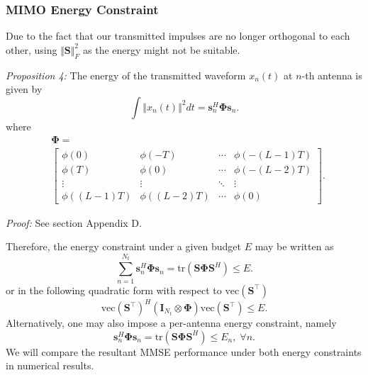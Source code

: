 \documentclass[lettersize,journal]{IEEEtran}
\newcommand{\nocolor}[1]{{\color{black}#1}}
\begin{document}
\subsubsection{MIMO Energy Constraint}
Due to the fact that our transmitted impulses are no longer orthogonal to each other, using $\Vert\mathbf{S}\Vert_F^2$ as the energy might not be suitable.

\textit{Proposition 4:} The energy of the transmitted waveform $x_n(t)$ at $n$-th antenna is given by
\begin{equation}
    \int\Vert x_n(t)\Vert^2 dt = \mathbf{s}_n^{H}\mathbf{\Phi}\mathbf{s}_n.
\end{equation}
where 
\begin{equation}
\begin{aligned}
    &\mathbf{\Phi} = \\
    &\begin{bmatrix}
        \phi(0) & \phi(-T) & \cdots & \phi(-(L-1)T) \\
        \phi(T) & \phi(0) & \cdots & \phi(-(L-2)T) \\
        \vdots & \vdots & \ddots & \vdots \\
        \phi((L-1)T) & \phi((L-2)T) & \cdots & \phi(0)
    \end{bmatrix}.
\end{aligned}
\end{equation}

\textit{Proof:} \nocolor{See section Appendix D}.

Therefore, the energy constraint under a given budget $E$ may be written as
\begin{equation}
    \sum_{n=1}^{N_t}\mathbf{s}_n^{H}\mathbf{\Phi}\mathbf{s}_n=\text{tr}(\mathbf{S}\mathbf{\Phi}\mathbf{S}^H)\leq E.
\end{equation}
or in the following quadratic form with respect to $\text{vec}(\mathbf{S}^{\top})$
\begin{equation}
    \text{vec}(\mathbf{S}^{\top})^H(\mathbf{I}_{N_t}\otimes\mathbf{\Phi})\text{vec}(\mathbf{S}^{\top})\leq E.
\end{equation}
\nocolor{Alternatively, one may also impose a per-antenna energy constraint, namely
\begin{equation}
    \mathbf{s}_n^{H}\mathbf{\Phi}\mathbf{s}_n=\text{tr}(\mathbf{S}\mathbf{\Phi}\mathbf{S}^H)\leq E_n,\;\forall n.
\end{equation}
We will compare the resultant MMSE performance under both energy constraints in numerical results.}
\end{document}
